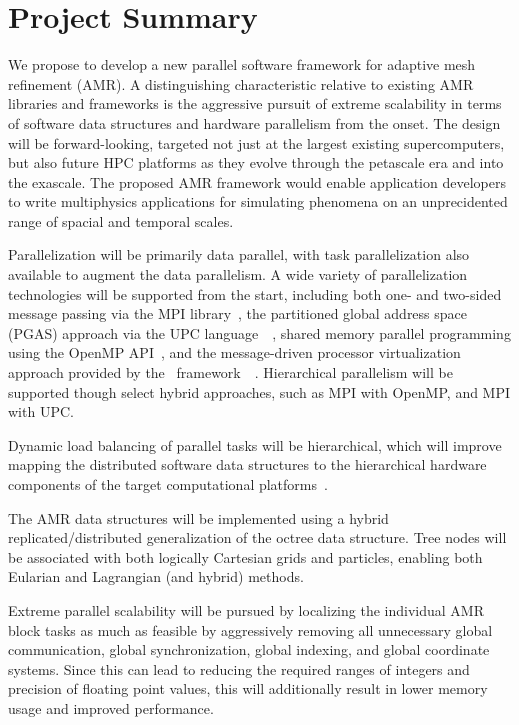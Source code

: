 \documentclass[10pt,twocolumn]{article}
\begin{document}
\section{Project Summary}  \label{s:summary}


%
We propose to develop a new parallel software framework for adaptive
mesh refinement (AMR).  
%
A distinguishing characteristic relative to existing AMR libraries and
frameworks is the aggressive pursuit of extreme scalability in terms
of software data structures and hardware parallelism from the
onset.
%
The design will be forward-looking, targeted not just at the largest
existing supercomputers, but also future HPC platforms as they evolve
through the petascale era and into the exascale.
%
The proposed AMR framework would enable application developers to
write multiphysics applications for simulating phenomena on an
unprecidented range of spacial and temporal scales.

%
Parallelization will be primarily data parallel, with task
parallelization also available to augment the data parallelism.
%
A wide variety of parallelization technologies will be supported from
the start, including both one- and two-sided message passing via the
MPI library~\cite{wwwmpi}, the partitioned global address space (PGAS)
approach via the UPC language~\cite{wwwupc}~\cite{upc}, shared memory
parallel programming using the OpenMP API~\cite{wwwopenmp}, and the
message-driven processor virtualization approach provided by the
\charm\ framework~\cite{KaBo07}~\cite{wwwcharm}.
%
Hierarchical parallelism will be supported though select hybrid
approaches, such as MPI with OpenMP, and MPI with UPC.

%
Dynamic load balancing of parallel tasks will be hierarchical, which
will improve mapping the distributed software data structures to the
hierarchical hardware components of the target computational
platforms~\cite{LaTa06}.

%
The AMR data structures will be implemented using a hybrid
replicated/distributed generalization of the octree data structure.
Tree nodes will be associated with both logically Cartesian grids and
particles, enabling both Eularian and Lagrangian (and hybrid) methods.

%
Extreme parallel scalability will be pursued by localizing the
individual AMR block tasks as much as feasible by aggressively
removing all unnecessary global communication, global synchronization,
global indexing, and global coordinate systems.  Since this can lead
to reducing the required ranges of integers and precision of floating
point values, this will additionally result in lower memory usage and
improved performance.
\end{document}
